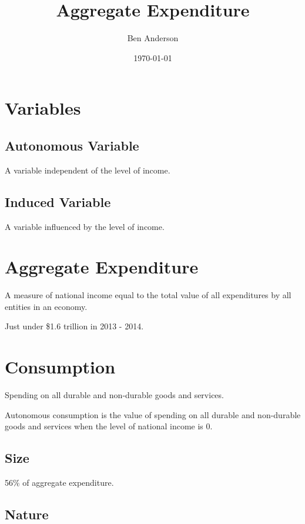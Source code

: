 \documentclass[a4paper,11pt]{article}
\begin{document}
\title{Aggregate Expenditure}
\author{Ben Anderson}
\date{\today}
\maketitle
\pagebreak

\tableofcontents
\pagebreak


\section{Variables}

\subsection{Autonomous Variable}

A variable independent of the level of income.

\subsection{Induced Variable}

A variable influenced by the level of income.




\section{Aggregate Expenditure}

A measure of national income equal to the total value of all expenditures
by all entities in an economy.

Just under \$1.6 trillion in 2013 - 2014.




\section{Consumption}

Spending on all durable and non-durable goods and services.

Autonomous consumption is the value of spending on all durable and non-durable
goods and services when the level of national income is 0.


\subsection{Size}

56\% of aggregate expenditure.


\subsection{Nature}
\end{document}
